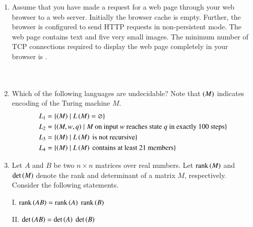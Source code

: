 \documentclass[journal,12pt,onecolumn]{IEEEtran}
\theoremstyle{remark}
\begin{document}
\begin{enumerate}
	\hfill{}
	
	\item Assume that you have made a request for a web page through your web browser to a web server. Initially the browser cache is empty. Further, the browser is configured to send HTTP requests in non-persistent mode. The web page contains text and five very small images. The minimum number of TCP connections required to display the web page completely in your browser is \underline{\hspace{2cm}}.
	\hfill{}\\
	\\
	\\
	\item Which of the following languages are undecidable? Note that $\left(M\right)$ indicates encoding of the Turing machine $M$.
	\begin{align*}
		L_{1} &= \{ \left(M\right) \mid L\left(M\right) = \varnothing \} \\
		L_{2} &= \{ \left(M,w,q\right) \mid M \text{ on input } w \text{ reaches state } q \text{ in exactly 100 steps} \} \\
		L_{3} &= \{ \left(M\right) \mid L\left(M\right) \text{ is not recursive} \} \\
		L_{4} &= \{ \left(M\right) \mid L\left(M\right) \text{ contains at least 21 members} \}
	\end{align*}\hfill{}
	\begin{enumerate}
	\end{enumerate}
	\item Let $A$ and $B$ be two $n \times n$ matrices over real numbers. Let $\text{rank}\left(M\right)$ and $\det\left(M\right)$ denote the rank and determinant of a matrix $M$, respectively. Consider the following statements.
	
	I. $\text{rank}\left(AB\right) = \text{rank}\left(A\right)\;\text{rank}\left(B\right)$
	
	II. $\det\left(AB\right) = \det\left(A\right)\;\det\left(B\right)$
	

\end{enumerate}
\end{document}
